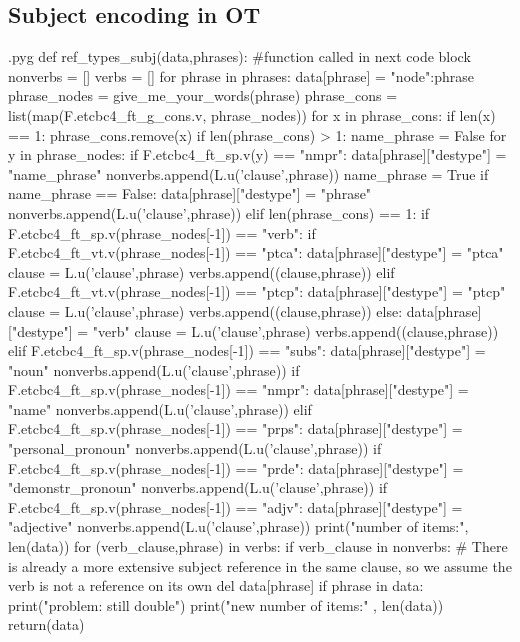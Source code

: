 \documentclass{report}
\makeatletter
\newenvironment{python}{%
  \VerbatimEnvironment
  \minted@resetoptions
  \setkeys{minted@opt}{}
      \begin{VerbatimOut}{\jobname.pyg}}
{%
      \end{VerbatimOut}
      \minted@pygmentize{python}
      \DeleteFile{\jobname.pyg}}
\makeatother
\begin{document}
\subsection{Subject encoding in OT}
\begin{python}
def ref_types_subj(data,phrases): #function called in next code block
    nonverbs = []
    verbs = []
    for phrase in phrases:
        data[phrase] = {"node":phrase}
        phrase_nodes = give_me_your_words(phrase)
        phrase_cons = list(map(F.etcbc4_ft_g_cons.v, phrase_nodes))
        for x in phrase_cons:
            if len(x) == 1:
                phrase_cons.remove(x)
        if len(phrase_cons) > 1:
            name_phrase = False
            for y in phrase_nodes:
                if F.etcbc4_ft_sp.v(y) == "nmpr":
                    data[phrase]["destype"] = "name_phrase"
                    nonverbs.append(L.u('clause',phrase))
                    name_phrase = True
            if name_phrase == False:
                data[phrase]["destype"] = "phrase"
                nonverbs.append(L.u('clause',phrase))
        elif len(phrase_cons) == 1:
            if F.etcbc4_ft_sp.v(phrase_nodes[-1]) == "verb":
                if F.etcbc4_ft_vt.v(phrase_nodes[-1]) == "ptca":
                    data[phrase]["destype"] = "ptca"
                    clause = L.u('clause',phrase)
                    verbs.append((clause,phrase))
                elif F.etcbc4_ft_vt.v(phrase_nodes[-1]) == "ptcp":
                    data[phrase]["destype"] = "ptcp"
                    clause = L.u('clause',phrase)
                    verbs.append((clause,phrase))
                else:
                    data[phrase]["destype"] = "verb"
                    clause = L.u('clause',phrase)
                    verbs.append((clause,phrase))
            elif F.etcbc4_ft_sp.v(phrase_nodes[-1]) == "subs":
                data[phrase]["destype"] = "noun"
                nonverbs.append(L.u('clause',phrase))
            if F.etcbc4_ft_sp.v(phrase_nodes[-1]) == "nmpr":
                data[phrase]["destype"] = "name"
                nonverbs.append(L.u('clause',phrase))
            elif F.etcbc4_ft_sp.v(phrase_nodes[-1]) == "prps":
                data[phrase]["destype"] = "personal_pronoun"
                nonverbs.append(L.u('clause',phrase))
            if F.etcbc4_ft_sp.v(phrase_nodes[-1]) == "prde":
                data[phrase]["destype"] = "demonstr_pronoun"
                nonverbs.append(L.u('clause',phrase))
            if F.etcbc4_ft_sp.v(phrase_nodes[-1]) == "adjv":
                data[phrase]["destype"] = "adjective"
                nonverbs.append(L.u('clause',phrase))
    print("number of items:", len(data))
    for (verb_clause,phrase) in verbs:
        if verb_clause in nonverbs: # There is already a more extensive subject reference in the same clause, so we assume the verb is not a reference on its own
            del data[phrase]
            if phrase in data:
                print("problem: still double")
    print("new number of items:" , len(data))
    return(data)
                    

\end{python}
\end{document}
